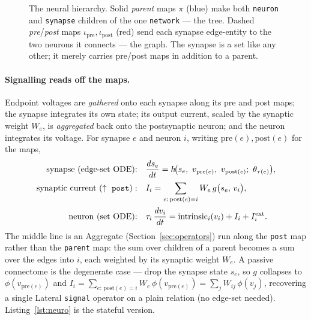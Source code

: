 \documentclass[11pt]{article}
\newcommand{\code}[1]{\texttt{#1}}
\begin{document}
\begin{figure}[h]
\centering
{}
\caption{The neural hierarchy. Solid \emph{parent} maps $\pi$ (blue) make both
\code{neuron} and \code{synapse} children of the one \code{network} --- the tree.
Dashed \emph{pre}/\emph{post} maps $\iota_{\mathrm{pre}},\iota_{\mathrm{post}}$ (red)
send each synapse edge-entity to the two neurons it connects --- the graph. The
synapse is a set like any other; it merely carries pre/post maps in addition to a
parent.}
\label{fig:neuro}
\end{figure}

\paragraph{Signalling reads off the maps.} Endpoint voltages are \emph{gathered}
onto each synapse along its pre and post maps; the synapse integrates its own state;
its output current, scaled by the synaptic weight $W_e$, is \emph{aggregated} back
onto the postsynaptic neuron; and the neuron integrates its voltage. For synapse $e$
and neuron $i$, writing $\mathrm{pre}(e),\mathrm{post}(e)$ for the maps,
\begin{align*}
\text{synapse (edge-set ODE):}\quad
  & \frac{d s_e}{dt}
    = h\!\big(s_e,\ v_{\mathrm{pre}(e)},\ v_{\mathrm{post}(e)};\ \theta_{\tau(e)}\big),\\[1pt]
\text{synaptic current}\ (\uparrow\ \text{\code{post}}):\quad
  & I_i = \sum_{e:\,\mathrm{post}(e)=i} W_e\, g\big(s_e,\, v_i\big),\\[1pt]
\text{neuron (set ODE):}\quad
  & \tau_i\,\frac{d v_i}{dt}
    = \mathrm{intrinsic}_i(v_i) + I_i + I^{\mathrm{ext}}_i .
\end{align*}
The middle line is an Aggregate (Section~\ref{sec:operators}) run along the
\code{post} map rather than the \code{parent} map: the sum over children of a parent
becomes a sum over the edges into $i$, each weighted by its synaptic weight $W_e$. A
passive connectome is the degenerate case --- drop the synapse state $s_e$, so $g$
collapses to $\phi(v_{\mathrm{pre}(e)})$ and
$I_i=\sum_{e:\,\mathrm{post}(e)=i} W_e\,\phi(v_{\mathrm{pre}(e)})=\sum_j W_{ij}\,\phi(v_j)$,
recovering a single Lateral \code{signal} operator on a plain relation (no edge-set
needed). Listing~\ref{lst:neuro} is the stateful version.
\end{document}
